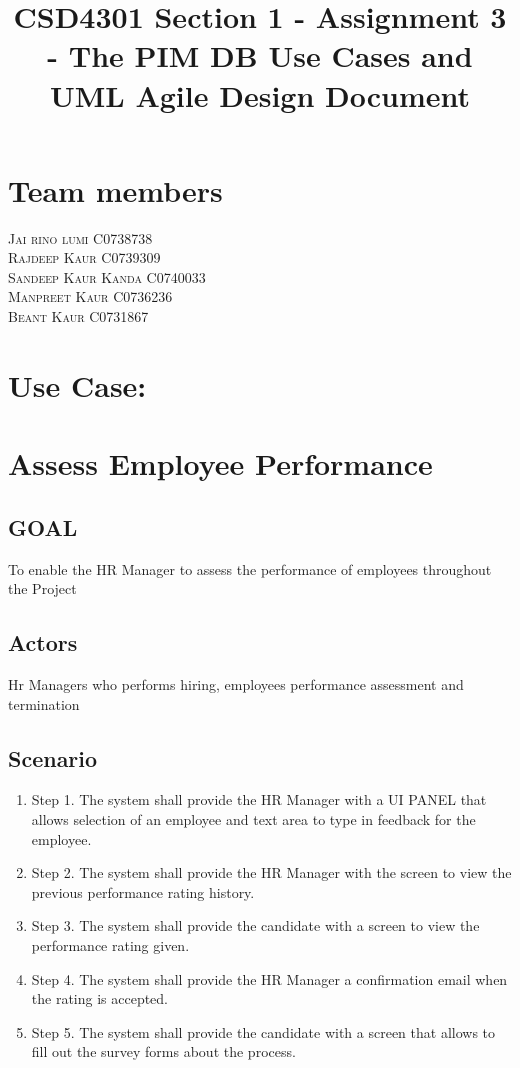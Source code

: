 \documentclass[10 pm]{article}
\title  {CSD4301 Section 1 - Assignment 3 - The PIM DB Use Cases and UML Agile Design Document }
\begin{document}
\maketitle
\author{}

\section * {Team members}

\textsc{Jai rino lumi C0738738}\\
\textsc{Rajdeep Kaur C0739309}\\
\textsc{Sandeep Kaur Kanda C0740033}\\
\textsc{Manpreet Kaur C0736236}\\
\textsc{Beant Kaur C0731867}\\

\section * {Use Case:}

\section * {Assess Employee Performance}
\subsection {GOAL}
To enable the HR Manager to assess the performance of employees throughout the Project
\subsection {Actors}
Hr Managers who performs hiring,  employees performance assessment and termination
\subsection {Scenario}

\begin{enumerate}
\item Step 1. The system shall provide the HR Manager with a UI PANEL that allows selection of an employee 
and text area to type in feedback for the employee.
\item Step 2. The system shall provide the HR Manager with the screen to view the previous performance rating history.
\item Step 3. The system shall provide the candidate with a screen to view the performance rating given.
\item Step 4. The system shall provide the HR Manager a confirmation email when the rating is accepted.
\item Step 5. The system shall provide the candidate with a screen that allows to fill out the survey forms about the process.
\end{enumerate}
\end{document}
